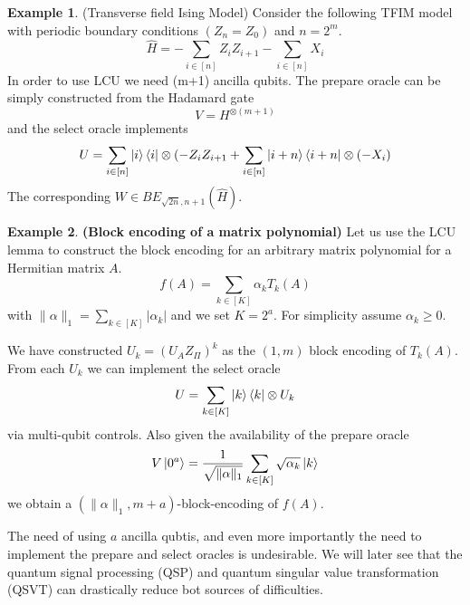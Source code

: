\documentclass[12pt, oneside]{book}
\theoremstyle{definition}
\theoremstyle{definition}
\newtheorem{example}{Example}[section]
\theoremstyle{remark}
\begin{document}
\begin{example}
    (Transverse field Ising Model) Consider the following TFIM model with periodic boundary conditions $(Z_n=Z_0)$ and $n=2^m$.
    \[
    \hat{H}=-\sum_{i\in[n]} Z_i Z_{i+1} - \sum_{i \in [n]} X_i
    \]
    In order to use LCU we need (m+1) ancilla qubits. The prepare oracle can be simply constructed from the Hadamard gate
    \[
    V =H^{\otimes (m+1)}
    \]
    and the select oracle implements
    \[
    U=\sum_{i\in[n]} \ket{i}\bra{i} \otimes (-Z_iZ_{i+1} + \sum_{i\in[n]} \ket{i+n}\bra{i+n}\otimes (-X_i)
    \]
    The corresponding $W\in BE_{\sqrt{2n},n+1}(\hat{H})$.
\end{example}
\begin{example}
    \textbf{(Block encoding of a matrix polynomial)} Let us use the LCU lemma to construct the block encoding for an arbitrary matrix polynomial for a Hermitian matrix $A$.
    \[
    f(A)=\sum_{k\in[K]}\alpha_kT_k(A)
    \]
    with $\|\alpha\|_1=\sum_{k\in[K]}|\alpha_k|$ and we set $K=2^a$. For simplicity assume $\alpha_k \geq 0$.

    We have constructed $U_k = (U_A Z_{\Pi})^k$ as the $(1,m)$ block encoding of $T_k(A)$. From each $U_k$ we can implement the select oracle
    \[
    U=\sum_{k\in[K]} \ket{k}\bra{k}\otimes U_k
    \]
    via multi-qubit controls. Also given the availability of the prepare oracle
    \[
    V\ket{0^a} = \frac{1}{\sqrt{\|\alpha\|_1}} \sum_{k\in[K]} \sqrt{\alpha_k}\ket{k}
    \]
    we obtain a $(\|\alpha\|_1,m+a)$-block-encoding of $f(A)$.

    The need of using $a$ ancilla qubtis, and even more importantly the need to implement the prepare and select oracles is undesirable. We will later see that the quantum signal processing (QSP) and quantum singular value transformation (QSVT) can drastically reduce bot sources of difficulties.
\end{example}
\end{document}
